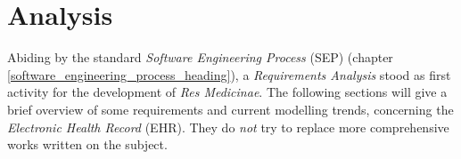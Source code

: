 %
%
%
%
%
%
%

\section{Analysis}
\label{analysis_heading}

Abiding by the standard \emph{Software Engineering Process} (SEP) (chapter
\ref{software_engineering_process_heading}), a \emph{Requirements Analysis}
stood as first activity for the development of \emph{Res Medicinae}. The
following sections will give a brief overview of some requirements and current
modelling trends, concerning the \emph{Electronic Health Record} (EHR). They do
\emph{not} try to replace more comprehensive works written on the subject.







